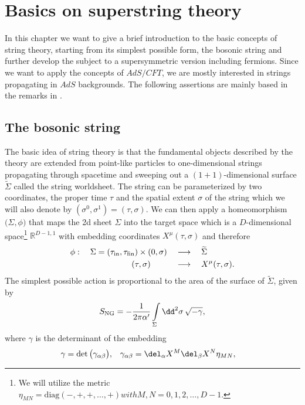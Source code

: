 \chapter{Basics on superstring theory}
In this chapter we want to give a brief introduction to the basic concepts of string theory, starting from its simplest possible form, the bosonic string and further develop the subject to a supersymmetric version including fermions. Since we want to apply the concepts of $AdS/CFT$, we are mostly interested in strings propagating in $AdS$ backgrounds. The following assertions are mainly based in the remarks in \cite{Polchinski:1998rq,Polchinski:1998rr}.
%
%
%
%
%
%
%
\section{The bosonic string}
The basic idea of string theory is that the fundamental objects described by the theory are extended from point-like particles to one-dimensional strings propagating through spacetime and sweeping out a $(1+1)$-dimensional surface $\widetilde{\Sigma}$ called the string worldsheet. The string can be parameterized by two coordinates, the proper time $\tau$ and the spatial extent $\sigma$ of the string which we will also denote by $(\sigma^{0},\sigma^{1})=(\tau,\sigma)$. We can then apply a homeomorphism $\big(\Sigma,\phi)$ that maps the 2d sheet $\Sigma$ into the target space which is a $D$-dimensional  space\footnote{We will utilize the metric $\eta_{MN}=\text{diag}(-,+,+,\ldots,+) with M,N=0,1,2,\ldots,D-1.$} $\mathbb{R}^{D-1,1}$ with embedding coordinates $X^{\mu}(\tau,\sigma)$ and therefore
%
%
\begin{equation}
\begin{alignedat}{3}
\phi :\quad  \Sigma = (\tau_{\rm in},\tau_{\rm fin}) \times (0,\sigma) \quad &\longrightarrow \quad \widetilde{\Sigma} \\
(\tau,\sigma) \qquad\quad &\longrightarrow \quad X^{\mu}(\tau,\sigma).
\end{alignedat}
\end{equation}
%
%
The simplest possible action is proportional to the area of the surface of $\widetilde{\Sigma}$, given by
%
%
\begin{equation}
S_{\rm NG} = -\frac{1}{2\pi\alpha'} \int\limits_{\Sigma} \dd^{2}\sigma \, \sqrt{-\gamma},
\end{equation}
%
%
where $\gamma$ is the  determinant of the embedding
%
%
\begin{align}
\gamma &= \det \big(\gamma_{\alpha\beta}\big), & \gamma_{\alpha\beta} &= \del_{\alpha}X^{M}\del_{\beta}X^{N}\eta_{MN},
\end{align}
